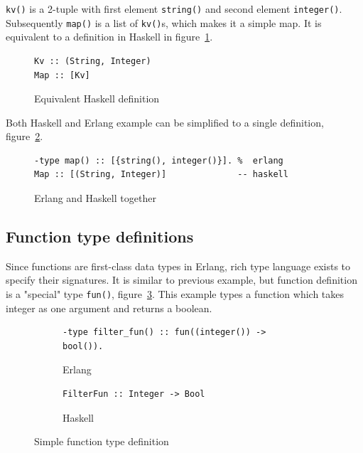 \documentclass[english,11pt]{l4proj}
\begin{document}
\begin{appendices}
{\tt kv()} is a 2-tuple with first element {\tt string()} and second element
{\tt integer()}. Subsequently {\tt map()} is a list of {\tt kv()}s, which makes
it a simple map. It is equivalent to a definition in Haskell in
figure~\ref{fig:haskell-simple-type}.

\begin{figure}
    \begin{verbatim}
Kv :: (String, Integer)
Map :: [Kv]
\end{verbatim}
    \caption{Equivalent Haskell definition}
    \label{fig:haskell-simple-type}
\end{figure}

Both Haskell and Erlang example can be simplified to a single definition,
figure~\ref{fig:haskell-erlang}.

\begin{figure}
    \begin{verbatim}
-type map() :: [{string(), integer()}]. %  erlang
Map :: [(String, Integer)]              -- haskell
    \end{verbatim}
    \caption{Erlang and Haskell together}
    \label{fig:haskell-erlang}
\end{figure}

\subsection{Function type definitions}

Since functions are first-class data types in Erlang, rich type language exists
to specify their signatures. It is similar to previous example, but function
definition is a "special" type {\tt fun()}, figure~\ref{fig:fun}. This example
types a function which takes integer as one argument and returns a boolean.

\begin{figure}
    \begin{subfigure}[b]{\textwidth}
        {\small \begin{verbatim}
-type filter_fun() :: fun((integer()) -> bool()).
            \end{verbatim}
        }
        \caption{Erlang}
    \end{subfigure}

    \begin{subfigure}[b]{\textwidth}
        {\small \begin{verbatim}
FilterFun :: Integer -> Bool
            \end{verbatim}
        }
        \caption{Haskell}
    \end{subfigure}
    \caption{Simple function type definition}
    \label{fig:fun}
\end{figure}



\end{appendices}
\end{document}
